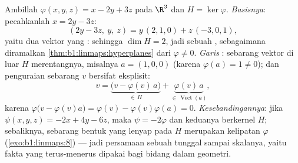 \begin{example}
\label{ex:b1:linmaps:hyperplanerun}
Ambillah $\varphi(x, y, z) = x - 2y + 3z$ pada $\R^3$ dan $H =
\ker\varphi$. \emph{Basisnya}: pecahkanlah $x = 2y - 3z$:
\[
(2y - 3z,\ y,\ z) = y\,(2, 1, 0) + z\,(-3, 0, 1),
\]
yaitu dua vektor yang : sehingga $\dim H = 2$, jadi sebuah , sebagaimana
diramalkan \cref{thm:b1:linmaps:hyperplanes} dari $\varphi \neq
0$. \emph{Garis }: sebarang vektor di luar $H$ merentangnya,
misalnya $a = (1, 0, 0)$ (karena $\varphi(a) = 1 \neq 0$); dan
penguraian sebarang $v$ bersifat eksplisit:
\[
v = \underbrace{\bigl(v - \varphi(v)\,a\bigr)}_{\in\,H}
+ \underbrace{\varphi(v)\,a}_{\in\,\operatorname{Vect}(a)},
\]
karena $\varphi\bigl(v - \varphi(v)a\bigr) = \varphi(v) -
\varphi(v)\varphi(a) = 0$. \emph{Kesebandingannya}: jika $\psi(x,y,z)
= -2x + 4y - 6z$, maka $\psi = -2\varphi$ dan keduanya berkernel
$H$; sebaliknya, sebarang bentuk yang lenyap pada $H$ merupakan kelipatan
$\varphi$ (\cref{exo:b1:linmaps:8}) --- jadi persamaan sebuah
 tunggal sampai skalanya, yaitu fakta yang terus-menerus dipakai bagi
bidang dalam geometri.
\end{example}

